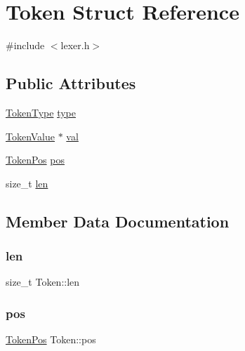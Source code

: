 \hypertarget{structToken}{}\section{Token Struct Reference}
\label{structToken}


{\ttfamily \#include $<$lexer.\+h$>$}

\subsection*{Public Attributes}
\begin{DoxyCompactItemize}
\item 
\hyperlink{lexer_8h_aa520fbf142ba1e7e659590c07da31921}{Token\+Type} \hyperlink{structToken_a67919af9f3a80dc0b28a0ab1e6d5bf8a}{type}
\item 
\hyperlink{unionTokenValue}{Token\+Value} $\ast$ \hyperlink{structToken_a1ac3c78f03efcbb1e5cae60d54ae3192}{val}
\item 
\hyperlink{structTokenPos}{Token\+Pos} \hyperlink{structToken_a5e328984b027a60401be5feddcde3e0d}{pos}
\item 
size\+\_\+t \hyperlink{structToken_afa8c8957df3c820f6b28539063312c5e}{len}
\end{DoxyCompactItemize}


\subsection{Member Data Documentation}
\hypertarget{structToken_afa8c8957df3c820f6b28539063312c5e}{}\label{structToken_afa8c8957df3c820f6b28539063312c5e} 
\subsubsection{\texorpdfstring{len}{len}}
{\footnotesize\ttfamily size\+\_\+t Token\+::len}

\hypertarget{structToken_a5e328984b027a60401be5feddcde3e0d}{}\label{structToken_a5e328984b027a60401be5feddcde3e0d} 
\subsubsection{\texorpdfstring{pos}{pos}}
{\footnotesize\ttfamily \hyperlink{structTokenPos}{Token\+Pos} Token\+::pos}

\hypertarget{structToken_a67919af9f3a80dc0b28a0ab1e6d5bf8a}{}\label{structToken_a67919af9f3a80dc0b28a0ab1e6d5bf8a} 
